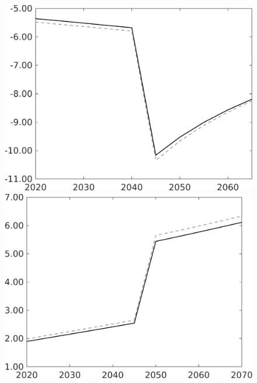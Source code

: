 \begin{figure}[h!!!]
\begin{minipage}[]{0.32\textwidth}
	\end{minipage}
\begin{minipage}[]{0.32\textwidth}
\includegraphics[width=1\textwidth]{../../codding_model/own_basedOnFried/optimalPol_010922_revision/figures/all_13Sept22_Tplus30/gAn_PercentageLFDynNT_noeff_Target_regime0_spillover0_knspil0_noskill0_sep0_xgrowth0_PV1_etaa0.79_lgd0.png}
\end{minipage}
	\begin{minipage}[]{0.32\textwidth}
		\includegraphics[width=1\textwidth]{../../codding_model/own_basedOnFried/optimalPol_010922_revision/figures/all_13Sept22_Tplus30/tauf_OPT_COMPtaul_regime0_spillover0_knspil0_noskill0_sep0_xgrowth0_PV1_etaa0.79_lgd0.png}

\end{minipage}
\end{figure}
